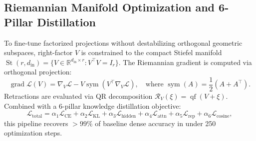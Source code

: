 \documentclass{article}
\begin{document}
\subsection{Riemannian Manifold Optimization and 6-Pillar Distillation}
To fine-tune factorized projections without destabilizing orthogonal geometric subspaces, right-factor $V$ is constrained to the compact Stiefel manifold $\operatorname{St}(r, d_{\text{in}}) = \{V \in \mathbb{R}^{d_{\text{in}} \times r} : V^\top V = I_r\}$. The Riemannian gradient is computed via orthogonal projection:
\begin{equation}
    \operatorname{grad} \mathcal{L}(V) = \nabla_V \mathcal{L} - V \operatorname{sym}(V^\top \nabla_V \mathcal{L}), \quad \text{where } \operatorname{sym}(A) = \frac{1}{2}(A + A^\top).
\end{equation}
Retractions are evaluated via QR decomposition $\mathcal{R}_V(\xi) = \operatorname{qf}(V + \xi)$. Combined with a 6-pillar knowledge distillation objective:
\begin{equation}
    \mathcal{L}_{\text{total}} = \alpha_1 \mathcal{L}_{\text{CE}} + \alpha_2 \mathcal{L}_{\text{KL}} + \alpha_3 \mathcal{L}_{\text{hidden}} + \alpha_4 \mathcal{L}_{\text{attn}} + \alpha_5 \mathcal{L}_{\text{rep}} + \alpha_6 \mathcal{L}_{\text{cosine}},
\end{equation}
this pipeline recovers $>99\%$ of baseline dense accuracy in under 250 optimization steps.
\end{document}
